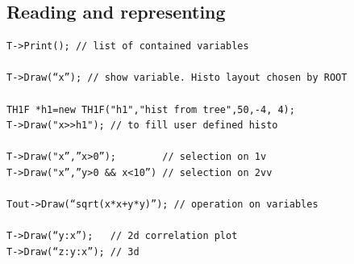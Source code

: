 \documentclass[10pt, twoside]{article}
\begin{document}
\subsection{Reading and representing}
\begin{verbatim}
T->Print(); // list of contained variables

T->Draw(“x”); // show variable. Histo layout chosen by ROOT

TH1F *h1=new TH1F("h1","hist from tree",50,-4, 4); 
T->Draw("x>>h1"); // to fill user defined histo

T->Draw("x”,”x>0”);        // selection on 1v
T->Draw("x”,”y>0 && x<10”) // selection on 2vv

Tout->Draw(“sqrt(x*x+y*y)”); // operation on variables

T->Draw(“y:x”);   // 2d correlation plot
T->Draw(“z:y:x”); // 3d
\end{verbatim}
\end{document}
